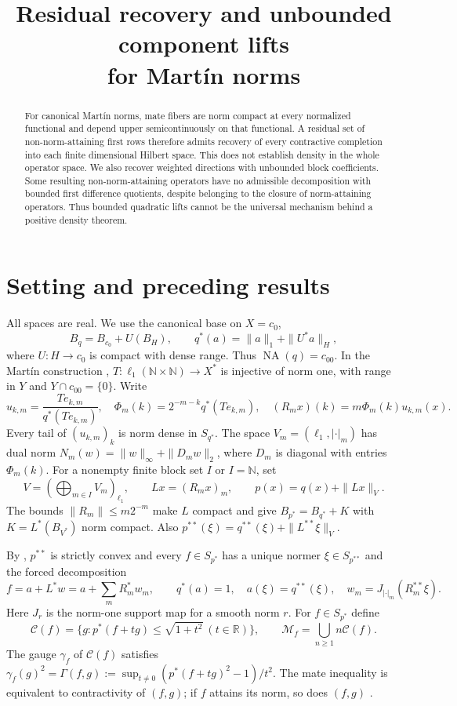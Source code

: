 \documentclass[10pt]{amsart}
\title{Residual recovery and unbounded component lifts\\for Mart\'in norms}
\newcommand{\NA}{\operatorname{NA}}
\newcommand{\R}{\mathbb R}
\newcommand{\N}{\mathbb N}
\newcommand{\Cset}{\mathcal C}
\newcommand{\Mset}{\mathcal M}
\begin{document}
\begin{abstract}
For canonical Mart\'in norms, mate fibers are norm compact at every
normalized functional and depend upper semicontinuously on that
functional. A residual set of non-norm-attaining first rows therefore
admits recovery of every contractive completion into each finite
dimensional Hilbert space. This does not establish density in the
whole operator space. We also recover weighted directions with
unbounded block coefficients. Some resulting non-norm-attaining
operators have no admissible decomposition with bounded first
difference quotients, despite belonging to the closure of
norm-attaining operators. Thus bounded quadratic lifts cannot be
the universal mechanism behind a positive density theorem.
\end{abstract}

\section{Setting and preceding results}
All spaces are real. We use the canonical base on $X=c_0$,
\[
 B_q=B_{c_0}+U(B_H),\qquad
 q^*(a)=\|a\|_1+\|U^*a\|_H,
\]
where $U:H\to c_0$ is compact with dense range. Thus
$\NA(q)=c_{00}$. In the Mart\'in construction \cite{Martin},
$T:\ell_1(\N\times\N)\to X^*$ is injective of norm one,
with range in $Y$ and $Y\cap c_{00}=\{0\}$. Write
\[
 u_{k,m}=\frac{Te_{k,m}}{q^*(Te_{k,m})},\quad
 \Phi_m(k)=2^{-m-k}q^*(Te_{k,m}),\quad
 (R_mx)(k)=m\Phi_m(k)u_{k,m}(x).
\]
Every tail of $(u_{k,m})_k$ is norm dense in $S_{q^*}$.
The space $V_m=(\ell_1,|\cdot|_m)$ has dual norm
$N_m(w)=\|w\|_\infty+\|D_mw\|_2$, where $D_m$ is diagonal
with entries $\Phi_m(k)$. For a nonempty finite block set $I$
or $I=\N$, set
\[
 V=(\bigoplus_{m\in I}V_m)_{\ell_1},\qquad
 Lx=(R_mx)_m,\qquad p(x)=q(x)+\|Lx\|_V.
\]
The bounds $\|R_m\|\leq m2^{-m}$ make $L$ compact and give
$B_{p^*}=B_{q^*}+K$ with $K=L^*(B_{V^*})$ norm compact.
Also $p^{**}(\xi)=q^{**}(\xi)+\|L^{**}\xi\|_V$.

By \cite{Recovery}, $p^{**}$ is strictly convex and every
$f\in S_{p^*}$ has a unique normer $\xi\in S_{p^{**}}$ and
the forced decomposition
\[
 f=a+L^*w=a+\sum_mR_m^*w_m,\qquad
 q^*(a)=1,\quad a(\xi)=q^{**}(\xi),\quad
 w_m=J_{|\cdot|_m}(R_m^{**}\xi).
\]
Here $J_r$ is the norm-one support map for a smooth norm $r$.
For $f\in S_{p^*}$ define
\[
 \Cset(f)=\{g:p^*(f+tg)\leq\sqrt{1+t^2}\ (t\in\R)\},
 \qquad \Mset_f=\bigcup_{n\geq1}n\Cset(f).
\]
The gauge $\gamma_f$ of $\Cset(f)$ satisfies
$\gamma_f(g)^2=\Gamma(f,g):=
\sup_{t\ne0}(p^*(f+tg)^2-1)/t^2$.
The mate inequality is equivalent to contractivity of $(f,g)$;
if $f$ attains its norm, so does $(f,g)$ \cite{KLMW}.
\end{document}
